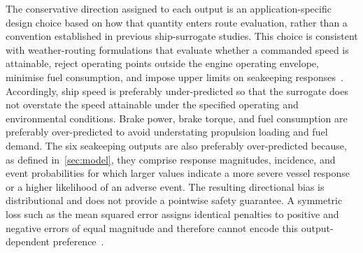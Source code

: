 \documentclass[final,5p,times,twocolumn,numbers]{elsarticle}
\begin{document}
The conservative direction assigned to each output is an application-specific design choice based on how that quantity enters route evaluation, rather than a convention established in previous ship-surrogate studies. This choice is consistent with weather-routing formulations that evaluate whether a commanded speed is attainable, reject operating points outside the engine operating envelope, minimise fuel consumption, and impose upper limits on seakeeping responses~\cite{pennino2020,kytariolou2022}. Accordingly, ship speed is preferably under-predicted so that the surrogate does not overstate the speed attainable under the specified operating and environmental conditions. Brake power, brake torque, and fuel consumption are preferably over-predicted to avoid understating propulsion loading and fuel demand. The six seakeeping outputs are also preferably over-predicted because, as defined in~\autoref{sec:model}, they comprise response magnitudes, incidence, and event probabilities for which larger values indicate a more severe vessel response or a higher likelihood of an adverse event. The resulting directional bias is distributional and does not provide a pointwise safety guarantee. A symmetric loss such as the mean squared error assigns identical penalties to positive and negative errors of equal magnitude and therefore cannot encode this output-dependent preference~\cite{newey1987}.
\end{document}
